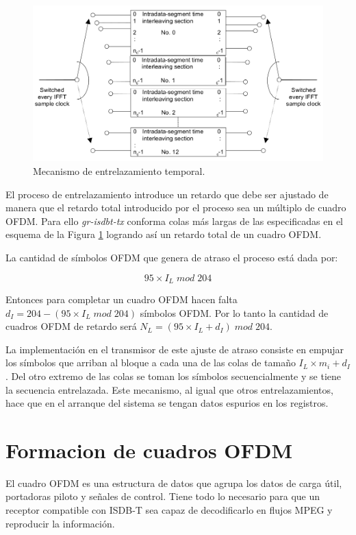 \begin{figure}[!h]
\centering
\includegraphics[scale=0.4]{figuras/cap05/entrelazamiento_temporal}
\caption{\label{f:entrelazamiento_temporal} Mecanismo de entrelazamiento temporal.}
\end{figure}

El proceso de entrelazamiento introduce un retardo que debe ser ajustado de manera que el retardo total introducido por el proceso sea un m\'ultiplo de cuadro OFDM. Para ello \textit{gr-isdbt-tx} conforma colas m\'as largas de las especificadas en el esquema de la Figura \ref{f:entrelazamiento_temporal} logrando as\'i un retardo total de un cuadro OFDM.

La cantidad de s\'imbolos OFDM que genera de atraso el proceso est\'a dada por:

\begin{equation}
95 \times I_L \; mod \; 204
\end{equation}

Entonces para completar un cuadro OFDM hacen falta $d_I = 204 - (95 \times I_L \; mod \; 204)$ s\'imbolos OFDM. Por lo tanto la cantidad de cuadros OFDM de retardo ser\'a $N_L = (95 \times I_L +d_I) \; mod \; 204$.

La implementaci\'on en el transmisor de este ajuste de atraso consiste en empujar los s\'imbolos que arriban al bloque a cada una de las colas de tamaño $I_L \times m_i + d_I$. Del otro extremo de las colas se toman los s\'imbolos secuencialmente y se tiene la secuencia entrelazada. Este mecanismo, al igual que otros entrelazamientos, hace que en el arranque del sistema se tengan datos espurios en los registros. 



\section{Formacion de cuadros OFDM}
El cuadro OFDM es una estructura de datos que agrupa los datos de carga \'util, portadoras piloto y señales de control. Tiene todo lo necesario para que un receptor compatible con ISDB-T sea capaz de decodificarlo en flujos MPEG y reproducir la informaci\'on.

